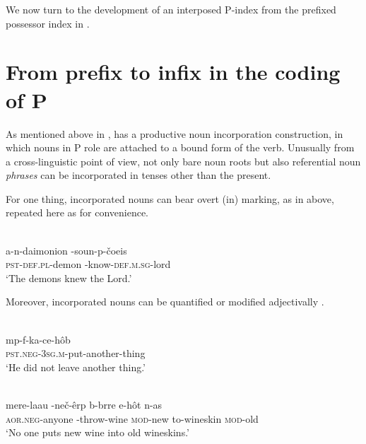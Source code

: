 \documentclass[output=paper]{LSP/langsci}
\begin{document}
We now turn to the development of an interposed P-index from the prefixed possessor index in . 


\section{From prefix to infix in the coding of P}\label{05-sec:5}

As mentioned above in ,  has a productive noun incorporation construction, in which nouns in P role are attached to a bound form of the verb. Unusually from a cross-linguistic point of view, not only bare noun roots but also referential noun \textit{phrases} can be incorporated in tenses other than the present.

For one thing, incorporated nouns can bear overt (in) marking, as in  above, repeated here as  for convenience.

\begin{exe}
\ex%
\label{05-gr-ex:35}
\\
\gll a-n-daimonion -soun-p-čoeis\\
\textsc{pst-def.pl}-demon -know-\textsc{def.m.sg}-lord\\
\glt ‘The demons knew the Lord.’
\end{exe}

Moreover, incorporated nouns can be quantified  or modified adjectivally .

\begin{exe}
\ex%
\label{05-gr-ex:36}
\\
\gll mp-f-ka-ce-hôb\\
\textsc{pst.neg-3sg.m}-put-another-thing\\
\glt ‘He did not leave another thing.’ 
\end{exe}


\begin{exe}
\ex%
\label{05-gr-ex:37}
\\
\gll mere-laau -neč-êrp b-brre e-hôt n-as\\
\textsc{aor.neg}-anyone -throw-wine \textsc{mod}-new to-wineskin \textsc{mod}-old\\
\glt ‘No one puts new wine into old wineskins.’  %
\end{exe}
\end{document}
